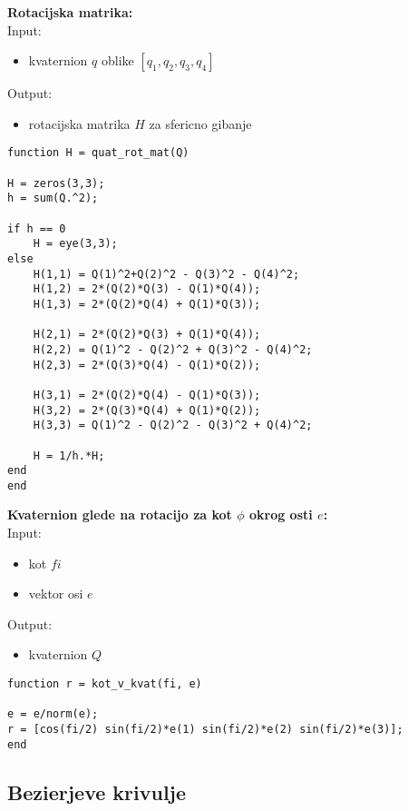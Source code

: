 \documentclass[12pt,a4paper,twoside]{article}
\theoremstyle{definition} %
\theoremstyle{plain} %
\numberwithin{equation}{section}  %
\begin{document}
\vspace{1cm}

\textbf{Rotacijska matrika:}\\
Input:
\begin{itemize}
\item kvaternion $q$ oblike $[q_1,q_2,q_3,q_4]$
\end{itemize}
Output: 
\begin{itemize}
\item rotacijska matrika $H$ za sfericno gibanje
\end{itemize}

\begin{lstlisting}[caption = {quat\_rot\_mat}]
function H = quat_rot_mat(Q)

H = zeros(3,3);
h = sum(Q.^2);

if h == 0
    H = eye(3,3);
else
    H(1,1) = Q(1)^2+Q(2)^2 - Q(3)^2 - Q(4)^2;
    H(1,2) = 2*(Q(2)*Q(3) - Q(1)*Q(4));
    H(1,3) = 2*(Q(2)*Q(4) + Q(1)*Q(3));

    H(2,1) = 2*(Q(2)*Q(3) + Q(1)*Q(4));
    H(2,2) = Q(1)^2 - Q(2)^2 + Q(3)^2 - Q(4)^2;
    H(2,3) = 2*(Q(3)*Q(4) - Q(1)*Q(2));

    H(3,1) = 2*(Q(2)*Q(4) - Q(1)*Q(3));
    H(3,2) = 2*(Q(3)*Q(4) + Q(1)*Q(2));
    H(3,3) = Q(1)^2 - Q(2)^2 - Q(3)^2 + Q(4)^2;

    H = 1/h.*H;  
end
end
\end{lstlisting}

\vspace{1cm}
\textbf{Kvaternion glede na rotacijo za kot $\phi$ okrog osti $e$:}\\
Input:
\begin{itemize}
\item kot $fi$
\item vektor osi $e$
\end{itemize}
Output:
\begin{itemize}
\item kvaternion $Q$
\end{itemize}

\begin{lstlisting}[caption = {kot\_v\_kvat}]
function r = kot_v_kvat(fi, e)

e = e/norm(e);
r = [cos(fi/2) sin(fi/2)*e(1) sin(fi/2)*e(2) sin(fi/2)*e(3)];
end
\end{lstlisting}

\newpage

\subsection{Bezierjeve krivulje}
\end{document}
